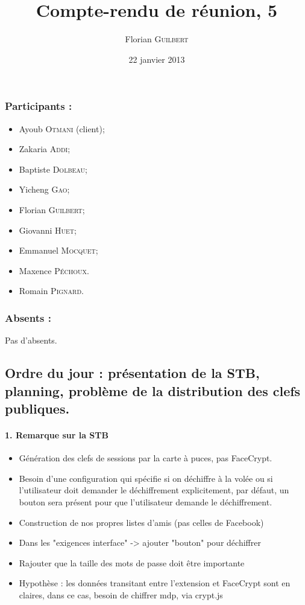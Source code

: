 \documentclass[a4paper,10pt]{article}
\author{Florian \textsc{Guilbert}}
\title{Compte-rendu de réunion, 5}
\date{22 janvier 2013}
\begin{document}
\maketitle

\subsubsection*{Participants : }
\begin{itemize}
    \item Ayoub \textsc{Otmani} (client);
    \item Zakaria \textsc{Addi};
    \item Baptiste \textsc{Dolbeau};
    \item Yicheng \textsc{Gao};
    \item Florian \textsc{Guilbert};
    \item Giovanni \textsc{Huet};
    \item Emmanuel \textsc{Mocquet};
    \item Maxence  \textsc{Péchoux}.
    \item Romain \textsc{Pignard}.
\end{itemize}

\subsubsection*{Absents : }
Pas d'absents.

\subsection*{Ordre du jour : présentation de la STB, planning, problème de la 
    distribution des clefs publiques.}


\paragraph{1. Remarque sur la STB}

\begin{itemize}
\item Génération des clefs de sessions par la carte à puces, pas FaceCrypt.
\item Besoin d'une configuration qui spécifie si on déchiffre à la volée ou si 
l'utilisateur doit demander le déchiffrement explicitement, par défaut,
un bouton sera présent pour que l'utilisateur demande le déchiffrement.
\item Construction de nos propres listes d'amis (pas celles de Facebook)
\item Dans les "exigences interface" -> ajouter "bouton" pour déchiffrer
\item Rajouter que la taille des mots de passe doit être importante
\item Hypothèse : les données transitant entre l'extension et FaceCrypt sont en 
claires, dans ce cas, besoin de chiffrer mdp, via crypt.js
\end{itemize}
\end{document}
